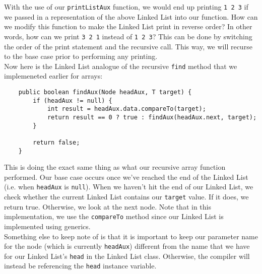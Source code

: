 \noindent With the use of our \verb!printListAux! function, we would end up printing \verb!1 2 3! if we passed in a representation of the above Linked List into our function. How can we modify this function to make the Linked List print in reverse order? In other words, how can we print \verb!3 2 1! instead of \verb!1 2 3!? This can be done by switching the order of the print statement and the recursive call. This way, we will recurse to the base case prior to performing any printing. \\

Now here is the Linked List analogue of the recursive \verb!find! method that we implemeneted earlier for arrays:

\begin{lstlisting}
    public boolean findAux(Node headAux, T target) {
		if (headAux != null) {
			int result = headAux.data.compareTo(target);
			return result == 0 ? true : findAux(headAux.next, target);
		}

		return false;
	}
\end{lstlisting}

This is doing the exact same thing as what our recursive array function performed. Our base case occurs once we've reached the end of the Linked List (i.e. when \verb!headAux! is \verb!null!). When we haven't hit the end of our Linked List, we check whether the current Linked List contains our \verb!target! value. If it does, we return true. Otherwise, we look at the next node. Note that in this implementation, we use the \verb!compareTo! method since our Linked List is implemented using generics. \\

Something else to keep note of is that it is important to keep our parameter name for the node (which is currently \verb!headAux!) different from the name that we have for our Linked List's \verb!head! in the Linked List class. Otherwise, the compiler will instead be referencing the \verb!head! instance variable. 